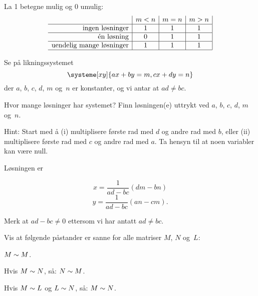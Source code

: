 \begin{losning}

La 1 betegne mulig og 0 umulig:
\[
\begin{array}{r|c|c|c|}
& m < n & m = n & m > n \\ \hline
\text{ingen løsninger}          &   1   &   1   &   1   \\ \hline
\text{én løsning}               &   0   &   1   &   1   \\ \hline
\text{uendelig mange løsninger} &   1   &   1   &   1   \\ \hline
\end{array}
\]
\end{losning}


\begin{oppgave}
Se på likningssystemet
\[
\systeme[xy]{
  ax + by = m,
  cx + dy = n
}
\]
der $a$, $b$, $c$, $d$, $m$ og~$n$ er konstanter, og vi antar at $ad \ne bc$.

Hvor mange løsninger har systemet?  Finn løsningen(e) uttrykt ved $a$,
$b$, $c$, $d$, $m$ og~$n$.

Hint: Start med å (i) multiplisere første rad med $d$ og andre rad med
$b$, eller (ii) multiplisere første rad med $c$ og andre rad med
$a$. Ta hensyn til at noen variabler kan være null.
\end{oppgave}
\begin{losning}
Løsningen er

$$x=\frac{1}{ad-bc}(dm-bn)$$
$$y=\frac{1}{ad-bc}(an-cm).$$

Merk at $ad-bc\neq 0$ ettersom vi har antatt $ad\neq bc$.

\end{losning}



\begin{oppgave}
Vis at følgende påstander er sanne for alle matriser $M$, $N$ og~$L$:
\begin{punkt}
$M \sim M$.
\end{punkt}
\begin{punkt}
Hvis $M \sim N$, så: $N \sim M$.
\end{punkt}
\begin{punkt}
Hvis $M \sim L$ og $L \sim N$, så: $M \sim N$.
\end{punkt}
\end{oppgave}

